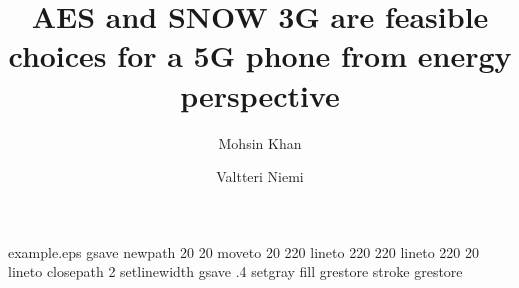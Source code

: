 %
%
%
%
%
\begin{filecontents*}{example.eps}
gsave
newpath
  20 20 moveto
  20 220 lineto
  220 220 lineto
  220 20 lineto
closepath
2 setlinewidth
gsave
  .4 setgray fill
grestore
stroke
grestore
\end{filecontents*}
%
\RequirePackage{fix-cm}
%
\documentclass[twocolumn]{svjour3}       %
%
\smartqed  %
%
\usepackage{graphicx}

\usepackage{color}
\usepackage[numbers]{natbib}



%
%
%
%
%


\title{AES and SNOW 3G are feasible choices for a 5G phone from energy perspective %
}


\author{Mohsin Khan         \and
        Valtteri Niemi %
}

